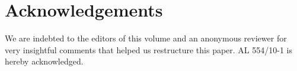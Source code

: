 \documentclass[output=paper]{langsci/langscibook}
\begin{document}
\section*{Acknowledgements}

We are indebted to the editors of this volume and an anonymous reviewer for very insightful comments that helped us restructure this paper. AL 554/10-1 is hereby acknowledged.

% 
% 
% 
% 
% 
% 
% 
% 
% 
% 
% 
% 
% 
% 
% 
% 
% 
% 
% 
% 
% 
% 
% 
% 
% 
% 
% 
% 
\end{document}
